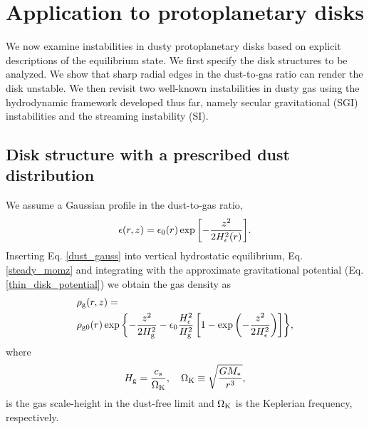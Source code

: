 



\section{Application to protoplanetary disks}\label{linear_problem}
We now examine instabilities in dusty protoplanetary disks
based on explicit descriptions of the equilibrium state. We first
specify the disk structures to be analyzed. We show  
that sharp radial edges in the dust-to-gas ratio can render the disk unstable. We then 
revisit two well-known instabilities in dusty gas using the
hydrodynamic framework developed thus far, namely secular gravitational (SGI) 
instabilities and the streaming instability (SI).  

\subsection{Disk structure with a prescribed dust distribution}\label{steady_state}  
We assume a Gaussian profile in the
dust-to-gas ratio,    
\begin{align}\label{dust_gauss}
  \epsilon(r,z) = \epsilon_0(r)
  \exp{\left[-\frac{z^2}{2H_\epsilon^2(r)}\right]}. 
\end{align}
Inserting Eq. \ref{dust_gauss} into vertical hydrostatic equilibrium,
Eq. \ref{steady_momz} and integrating with the approximate
gravitational potential (Eq. \ref{thin_disk_potential}) we obtain the
gas density as
\begin{align}
  &\rho_\mathrm{g}(r,z)= \notag\\
&\rho_\mathrm{g0}(r)\exp{\left\{ - \frac{z^2}{2H_\mathrm{g}^2}
    -\epsilon_0\frac{H_\epsilon^2}{H_\mathrm{g}^2}\left[1 -
      \exp{\left(-\frac{z^2}{2H_\epsilon^2}\right)}\right] \right\}}, 
\end{align}
where
\begin{align}
  H_\mathrm{g} = \frac{c_s}{\Omega_{\rm K}}, \quad \Omega_{\rm K} \equiv \sqrt{\frac{GM_*}{r^3}},   
\end{align}
is the gas scale-height in the dust-free limit and $\Omega_{\rm K}$ is the
Keplerian frequency, respectively. 

